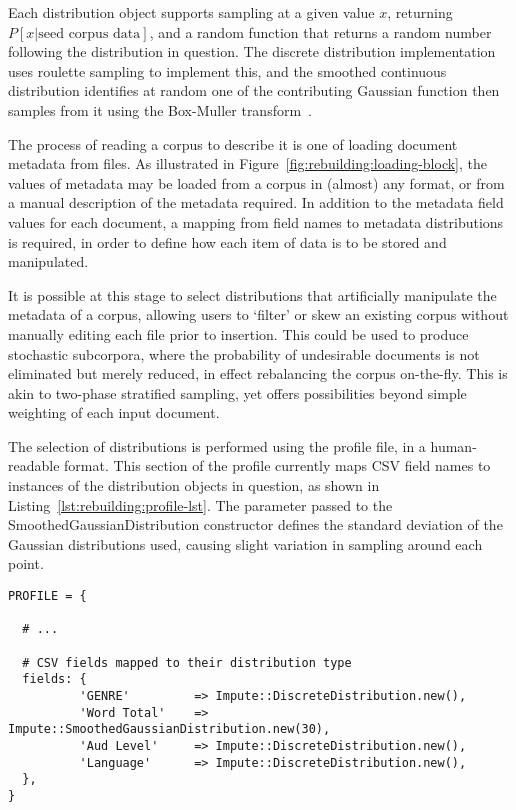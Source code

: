 Each distribution object supports sampling at a given value $x$, returning $P[x | \text{seed corpus data}]$, and a random function that returns a random number following the distribution in question.  The discrete distribution implementation uses roulette sampling to implement this, and the smoothed continuous distribution identifies at random one of the contributing Gaussian function then samples from it using the Box-Muller transform~\cite{box1958}.

The process of reading a corpus to describe it is one of loading document metadata from files.  As illustrated in Figure~\ref{fig:rebuilding:loading-block}, the values of metadata may be loaded from a corpus in (almost) any format, or from a manual description of the metadata required.  In addition to the metadata field values for each document, a mapping from field names to metadata distributions is required, in order to define how each item of data is to be stored and manipulated.

It is possible at this stage to select distributions that artificially manipulate the metadata of a corpus, allowing users to `filter' or skew an existing corpus without manually editing each file prior to insertion.  This could be used to produce stochastic subcorpora, where the probability of undesirable documents is not eliminated but merely reduced, in effect rebalancing the corpus on-the-fly.  This is akin to two-phase stratified sampling, yet offers possibilities beyond simple weighting of each input document.

The selection of distributions is performed using the profile file, in a human-readable format.  This section of the profile currently maps CSV field names to instances of the distribution objects in question, as shown in Listing~\ref{lst:rebuilding:profile-lst}.  The parameter passed to the SmoothedGaussianDistribution constructor defines the standard deviation of the Gaussian distributions used, causing slight variation in sampling around each point.

\begin{lstlisting}
PROFILE = {

  # ...

  # CSV fields mapped to their distribution type
  fields: {
          'GENRE'         => Impute::DiscreteDistribution.new(),
          'Word Total'    => Impute::SmoothedGaussianDistribution.new(30),
          'Aud Level'     => Impute::DiscreteDistribution.new(),
          'Language'      => Impute::DiscreteDistribution.new(),
  },
}
\end{lstlisting}

